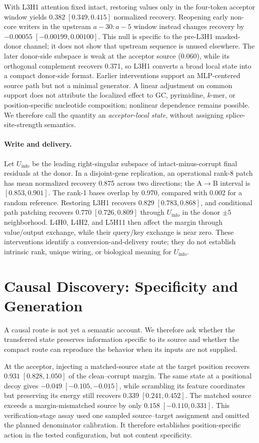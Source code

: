 \documentclass{article}
\newcommand{\Uinfo}{\ensuremath{U_{\mathrm{info}}}}
\begin{document}
With L3H1 attention fixed intact, restoring values only in the four-token acceptor window yields \(0.382\;[0.349,0.415]\) normalized recovery. Reopening early non-core writers in the upstream \(a-30{:}a-5\) window instead changes recovery by \(-0.00055\;[-0.00199,0.00100]\). This null is specific to the pre-L3H1 masked-donor channel; it does not show that upstream sequence is unused elsewhere. The later donor-side subspace is weak at the acceptor source (0.060), while its orthogonal complement recovers 0.371, so L3H1 converts a broad local state into a compact donor-side format. Earlier interventions support an MLP-centered source path but not a minimal generator. A linear adjustment on common support does not attribute the localized effect to GC, pyrimidine, \(k\)-mer, or position-specific nucleotide composition; nonlinear dependence remains possible. We therefore call the quantity an \emph{acceptor-local state}, without assigning splice-site-strength semantics.

\paragraph{Write and delivery.}
Let \Uinfo{} be the leading right-singular subspace of intact-minus-corrupt final residuals at the
donor. In a disjoint-gene replication, an operational rank-8 patch has mean normalized recovery 0.875 across two directions; the A\(\rightarrow\)B interval is \([0.853,0.901]\). The rank-1 bases overlap
by 0.970, compared with 0.002 for a random reference. Restoring L3H1 recovers \(0.829\;[0.783,0.868]\), and conditional path patching recovers \(0.770\;[0.726,0.809]\) through \Uinfo{} in the donor \(\pm5\) neighborhood. L4H0, L4H2, and L5H11 then affect the margin through value/output exchange, while their query/key exchange is near zero. These interventions identify a conversion-and-delivery route; they do not establish intrinsic rank, unique wiring, or biological meaning for \Uinfo{}.

\section{Causal Discovery: Specificity and Generation}
\label{sec:transfer}

A causal route is not yet a semantic account. We therefore ask whether the transferred state preserves information specific to its source and whether the compact route can reproduce the behavior when its inputs are not supplied.

At the acceptor, injecting a matched-source state at the target position recovers \(0.931\;[0.828,1.050]\) of the clean--corrupt margin. The same state at a positional decoy gives \(-0.049\;[-0.105,-0.015]\), while scrambling its feature coordinates but preserving its energy still recovers \(0.339\;[0.241,0.452]\). The matched source exceeds a margin-mismatched source by only \(0.158\;[-0.110,0.331]\). This verification-stage assay used one sampled source--target assignment and omitted the planned denominator calibration. It therefore establishes position-specific action in the tested configuration, but not content specificity.
\end{document}
